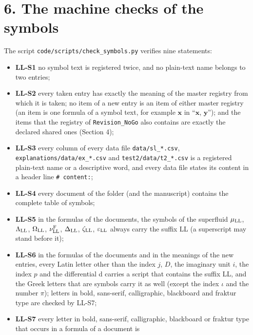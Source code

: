 \documentclass[
  10pt,
]{article}
\providecommand{\tightlist}{%
  \setlength{\itemsep}{0pt}\setlength{\parskip}{0pt}}
\begin{document}
\hypertarget{the-machine-checks-of-the-symbols}{%
\section{6. The machine checks of the
symbols}\label{the-machine-checks-of-the-symbols}}

The script \texttt{code/scripts/check\_symbols.py} verifies nine
statements:

\begin{itemize}
\tightlist
\item
  \textbf{LL-S1} no symbol text is registered twice, and no plain-text
  name belongs to two entries;
\item
  \textbf{LL-S2} every taken entry has exactly the meaning of the master
  registry from which it is taken; no item of a new entry is an item of
  either master registry (an item is one formula of a symbol text, for
  example \(\mathbf x\) in ``\(\mathbf x\), \(\mathbf y\)''); and the
  items that the registry of \texttt{Revision\_NoGo} also contains are
  exactly the declared shared ones (Section 4);
\item
  \textbf{LL-S3} every column of every data file
  \texttt{data/sl\_*.csv}, \texttt{explanations/data/ex\_*.csv} and
  \texttt{test2/data/t2\_*.csv} is a registered plain-text name or a
  descriptive word, and every data file states its content in a header
  line \texttt{\#\ content:};
\item
  \textbf{LL-S4} every document of the folder (and the manuscript)
  contains the complete table of symbols;
\item
  \textbf{LL-S5} in the formulas of the documents, the symbols of the
  superfluid \(\mu_{\rm LL}\), \(\Lambda_{\rm LL}\),
  \(\Omega_{\rm LL}\), \(\nu^{\rm F}_{\rm LL}\), \(\Delta_{\rm LL}\),
  \(\zeta_{\rm LL}\), \(\varepsilon_{\rm LL}\) always carry the suffix
  LL (a superscript may stand before it);
\item
  \textbf{LL-S6} in the formulas of the documents and in the meanings of
  the new entries, every Latin letter other than the index \(j\), \(D\),
  the imaginary unit \(i\), the index \(p\) and the differential d
  carries a script that contains the suffix LL, and the Greek letters
  that are symbols carry it as well (except the index \(\iota\) and the
  number \(\pi\)); letters in bold, sans-serif, calligraphic, blackboard
  and fraktur type are checked by LL-S7;
\item
  \textbf{LL-S7} every letter in bold, sans-serif, calligraphic,
  blackboard or fraktur type that occurs in a formula of a document is

\end{itemize}
\end{document}
